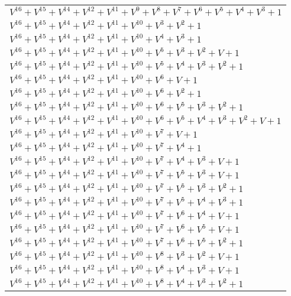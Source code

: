 \documentclass[12pt]{article}
\begin{document}
\begin{adjustwidth}{-4cm}{}
\begin{center}
\begin{longtable}{|l|}
$V^{16}  +V^{15}  +V^{14}  +V^{12}  +V^{11}  +V^{9}  +V^{8}  +V^{7}  +V^{6}  +V^{5}  +V^{4}  +V^{3}  + 1$ \\
$V^{16}  +V^{15}  +V^{14}  +V^{12}  +V^{11}  +V^{10}  +V^{3}  +V^{2}  + 1$ \\
$V^{16}  +V^{15}  +V^{14}  +V^{12}  +V^{11}  +V^{10}  +V^{4}  +V^{3}  + 1$ \\
$V^{16}  +V^{15}  +V^{14}  +V^{12}  +V^{11}  +V^{10}  +V^{5}  +V^{3}  +V^{2}  + V + 1$ \\
$V^{16}  +V^{15}  +V^{14}  +V^{12}  +V^{11}  +V^{10}  +V^{5}  +V^{4}  +V^{3}  +V^{2}  + 1$ \\
$V^{16}  +V^{15}  +V^{14}  +V^{12}  +V^{11}  +V^{10}  +V^{6}  + V + 1$ \\
$V^{16}  +V^{15}  +V^{14}  +V^{12}  +V^{11}  +V^{10}  +V^{6}  +V^{2}  + 1$ \\
$V^{16}  +V^{15}  +V^{14}  +V^{12}  +V^{11}  +V^{10}  +V^{6}  +V^{5}  +V^{3}  +V^{2}  + 1$ \\
$V^{16}  +V^{15}  +V^{14}  +V^{12}  +V^{11}  +V^{10}  +V^{6}  +V^{5}  +V^{4}  +V^{3}  +V^{2}  + V + 1$ \\
$V^{16}  +V^{15}  +V^{14}  +V^{12}  +V^{11}  +V^{10}  +V^{7}  + V + 1$ \\
$V^{16}  +V^{15}  +V^{14}  +V^{12}  +V^{11}  +V^{10}  +V^{7}  +V^{4}  + 1$ \\
$V^{16}  +V^{15}  +V^{14}  +V^{12}  +V^{11}  +V^{10}  +V^{7}  +V^{4}  +V^{3}  + V + 1$ \\
$V^{16}  +V^{15}  +V^{14}  +V^{12}  +V^{11}  +V^{10}  +V^{7}  +V^{5}  +V^{3}  + V + 1$ \\
$V^{16}  +V^{15}  +V^{14}  +V^{12}  +V^{11}  +V^{10}  +V^{7}  +V^{5}  +V^{3}  +V^{2}  + 1$ \\
$V^{16}  +V^{15}  +V^{14}  +V^{12}  +V^{11}  +V^{10}  +V^{7}  +V^{5}  +V^{4}  +V^{3}  + 1$ \\
$V^{16}  +V^{15}  +V^{14}  +V^{12}  +V^{11}  +V^{10}  +V^{7}  +V^{6}  +V^{4}  + V + 1$ \\
$V^{16}  +V^{15}  +V^{14}  +V^{12}  +V^{11}  +V^{10}  +V^{7}  +V^{6}  +V^{5}  + V + 1$ \\
$V^{16}  +V^{15}  +V^{14}  +V^{12}  +V^{11}  +V^{10}  +V^{7}  +V^{6}  +V^{5}  +V^{2}  + 1$ \\
$V^{16}  +V^{15}  +V^{14}  +V^{12}  +V^{11}  +V^{10}  +V^{8}  +V^{3}  +V^{2}  + V + 1$ \\
$V^{16}  +V^{15}  +V^{14}  +V^{12}  +V^{11}  +V^{10}  +V^{8}  +V^{4}  +V^{3}  + V + 1$ \\
$V^{16}  +V^{15}  +V^{14}  +V^{12}  +V^{11}  +V^{10}  +V^{8}  +V^{4}  +V^{3}  +V^{2}  + 1$ \\

\end{longtable}
\end{center}
\end{adjustwidth}
\end{document}
